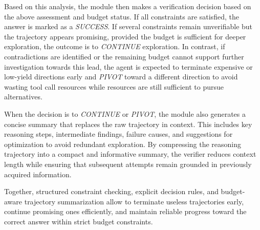Based on this analysis, the module then makes a verification decision based on the above assessment and budget status. If all constraints are satisfied, the answer is marked as a \textit{SUCCESS}. If several constraints remain unverifiable but the trajectory appears promising, provided the budget is sufficient for deeper exploration, the outcome is to \textit{CONTINUE} exploration. In contrast, if contradictions are identified or the remaining budget cannot support further investigation towards this lead, the agent is expected to terminate expensive or low-yield directions early and \textit{PIVOT} toward a different direction to avoid wasting tool call resources while resources are still sufficient to pursue alternatives.

When the decision is to \textit{CONTINUE} or \textit{PIVOT}, the module also generates a concise summary that replaces the raw trajectory in context. This includes key reasoning steps, intermediate findings, failure causes, and suggestions for optimization to avoid redundant exploration.
By compressing the reasoning trajectory into a compact and informative summary, the verifier reduces context length while ensuring that subsequent attempts remain grounded in previously acquired information.

Together, structured constraint checking, explicit decision rules, and budget-aware trajectory summarization allow \method to terminate useless trajectories early, continue promising ones efficiently, and maintain reliable progress toward the correct answer within strict budget constraints. 
